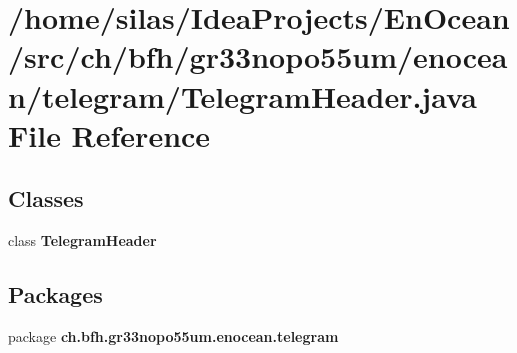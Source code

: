 \section{/home/silas/\+Idea\+Projects/\+En\+Ocean/src/ch/bfh/gr33nopo55um/enocean/telegram/\+Telegram\+Header.java File Reference}
\label{TelegramHeader_8java}
\subsection*{Classes}
\begin{DoxyCompactItemize}
\item 
class {\bf Telegram\+Header}
\end{DoxyCompactItemize}
\subsection*{Packages}
\begin{DoxyCompactItemize}
\item 
package {\bf ch.\+bfh.\+gr33nopo55um.\+enocean.\+telegram}
\end{DoxyCompactItemize}
